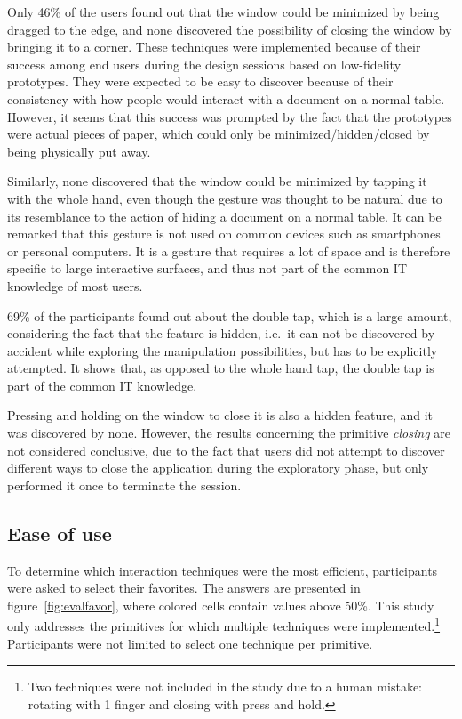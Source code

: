 Only 46\% of the users found out that the window could be minimized by being dragged to the edge, and none discovered the possibility of closing the window by bringing it to a corner.
These techniques were implemented because of their success among end users during the design sessions based on low-fidelity prototypes.
They were expected to be easy to discover because of their consistency with how people would interact with a document on a normal table.
However, it seems that this success was prompted by the fact that  the prototypes were actual pieces of paper, which could only be minimized/hidden/closed by being physically put away.

Similarly, none discovered that the window could be minimized by tapping it with the whole hand, even though the gesture was thought to be natural due to its resemblance to the action of hiding a document on a normal table.
It can be remarked that this gesture is not used on common devices such as smartphones or personal computers.
It is a gesture that requires a lot of space and is therefore specific to large interactive surfaces, and thus not part of the common IT knowledge of most users.

69\% of the participants found out about the double tap, which is a large amount, considering the fact that the feature is hidden, i.e.\ it can not be discovered by accident while exploring the manipulation possibilities, but has to be explicitly attempted.
It shows that, as opposed to the whole hand tap, the double tap is part of the common IT knowledge.

Pressing and holding on the window to close it is also a hidden feature, and it was discovered by none.
However, the results concerning the primitive \emph{closing} are not considered conclusive, due to the fact that users did not attempt to discover different ways to close the application during the exploratory phase, but only performed it once to terminate the session.

\subsection{Ease of use}

To determine which interaction techniques were the most efficient, participants were asked to select their favorites.
The answers are presented in figure~\ref{fig:evalfavor}, where colored cells contain values above 50\%.
This study only addresses the primitives for which multiple techniques were implemented.\footnote{Two techniques were not included in the study due to a human mistake: rotating with 1 finger and closing with press and hold.}
Participants were not limited to select one technique per primitive.

